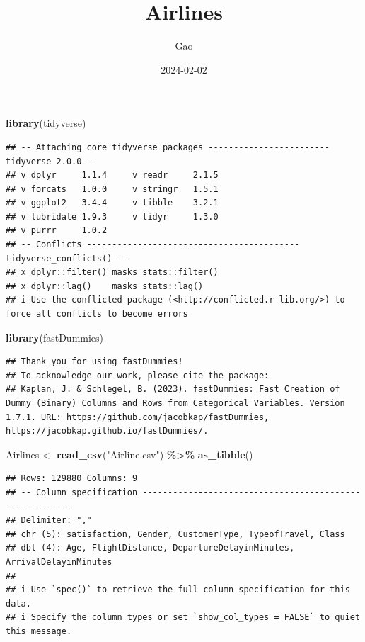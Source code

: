 \documentclass[
]{article}
\title{Airlines}
\author{Gao}
\date{2024-02-02}
\newenvironment{Shaded}{\begin{snugshade}}{\end{snugshade}}
\newcommand{\FunctionTok}[1]{\textcolor[rgb]{0.13,0.29,0.53}{\textbf{#1}}}
\newcommand{\NormalTok}[1]{#1}
\newcommand{\OtherTok}[1]{\textcolor[rgb]{0.56,0.35,0.01}{#1}}
\newcommand{\SpecialCharTok}[1]{\textcolor[rgb]{0.81,0.36,0.00}{\textbf{#1}}}
\newcommand{\StringTok}[1]{\textcolor[rgb]{0.31,0.60,0.02}{#1}}
\begin{document}
\maketitle

\begin{Shaded}
\begin{Highlighting}[]
\FunctionTok{library}\NormalTok{(tidyverse)}
\end{Highlighting}
\end{Shaded}

\begin{verbatim}
## -- Attaching core tidyverse packages ------------------------ tidyverse 2.0.0 --
## v dplyr     1.1.4     v readr     2.1.5
## v forcats   1.0.0     v stringr   1.5.1
## v ggplot2   3.4.4     v tibble    3.2.1
## v lubridate 1.9.3     v tidyr     1.3.0
## v purrr     1.0.2     
## -- Conflicts ------------------------------------------ tidyverse_conflicts() --
## x dplyr::filter() masks stats::filter()
## x dplyr::lag()    masks stats::lag()
## i Use the conflicted package (<http://conflicted.r-lib.org/>) to force all conflicts to become errors
\end{verbatim}

\begin{Shaded}
\begin{Highlighting}[]
\FunctionTok{library}\NormalTok{(fastDummies)}
\end{Highlighting}
\end{Shaded}

\begin{verbatim}
## Thank you for using fastDummies!
## To acknowledge our work, please cite the package:
## Kaplan, J. & Schlegel, B. (2023). fastDummies: Fast Creation of Dummy (Binary) Columns and Rows from Categorical Variables. Version 1.7.1. URL: https://github.com/jacobkap/fastDummies, https://jacobkap.github.io/fastDummies/.
\end{verbatim}

\begin{Shaded}
\begin{Highlighting}[]
\NormalTok{Airlines }\OtherTok{\textless{}{-}} \FunctionTok{read\_csv}\NormalTok{(}\StringTok{"Airline.csv"}\NormalTok{) }\SpecialCharTok{\%\textgreater{}\%} \FunctionTok{as\_tibble}\NormalTok{()}
\end{Highlighting}
\end{Shaded}

\begin{verbatim}
## Rows: 129880 Columns: 9
## -- Column specification --------------------------------------------------------
## Delimiter: ","
## chr (5): satisfaction, Gender, CustomerType, TypeofTravel, Class
## dbl (4): Age, FlightDistance, DepartureDelayinMinutes, ArrivalDelayinMinutes
## 
## i Use `spec()` to retrieve the full column specification for this data.
## i Specify the column types or set `show_col_types = FALSE` to quiet this message.
\end{verbatim}
\end{document}
